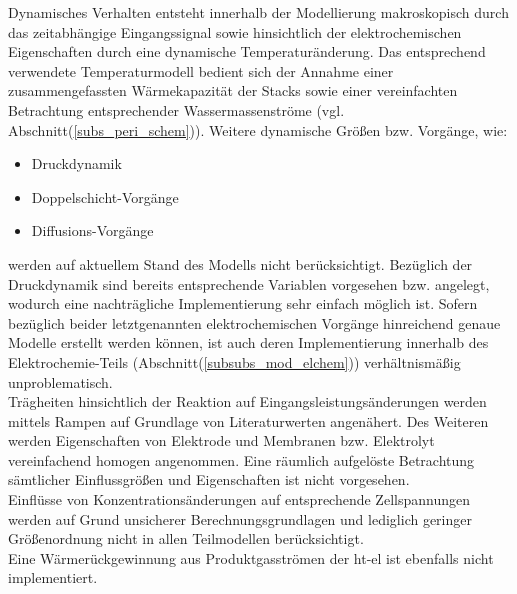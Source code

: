 \documentclass[onecolumn,10pt,titlepage]{article}
\begin{document}
Dynamisches Verhalten entsteht innerhalb der Modellierung makroskopisch durch das zeitabhängige Eingangssignal sowie hinsichtlich der elektrochemischen Eigenschaften durch eine dynamische Temperaturänderung. Das entsprechend verwendete Temperaturmodell bedient sich der Annahme einer zusammengefassten Wärmekapazität der Stacks sowie einer vereinfachten Betrachtung entsprechender Wassermassenströme (vgl. Abschnitt(\ref{subs_peri_schem})). Weitere dynamische Größen bzw. Vorgänge, wie:
\begin{itemize}
	\item Druckdynamik
	\item Doppelschicht-Vorgänge
	\item Diffusions-Vorgänge
\end{itemize}
werden auf aktuellem Stand des Modells nicht berücksichtigt. Bezüglich der Druckdynamik sind bereits entsprechende Variablen vorgesehen bzw. angelegt, wodurch eine nachträgliche Implementierung sehr einfach möglich ist. Sofern bezüglich beider letztgenannten elektrochemischen Vorgänge hinreichend genaue Modelle erstellt werden können, ist auch deren Implementierung innerhalb des Elektrochemie-Teils (Abschnitt(\ref{subsubs_mod_elchem})) verhältnismäßig unproblematisch.\\
Trägheiten hinsichtlich der Reaktion auf Eingangsleistungsänderungen werden mittels Rampen auf Grundlage von Literaturwerten \cite{Buttler.2018} angenähert.
Des Weiteren werden Eigenschaften von Elektrode und Membranen bzw. Elektrolyt vereinfachend homogen angenommen. Eine räumlich aufgelöste Betrachtung sämtlicher Einflussgrößen und Eigenschaften ist nicht vorgesehen.\\
Einflüsse von Konzentrationsänderungen auf entsprechende Zellspannungen werden auf Grund unsicherer Berechnungsgrundlagen und lediglich geringer Größenordnung nicht in allen Teilmodellen berücksichtigt.\\
Eine Wärmerückgewinnung aus Produktgasströmen der \gls{ht}-\gls{el} ist ebenfalls nicht implementiert.\\

%
%
%
%
\end{document}
